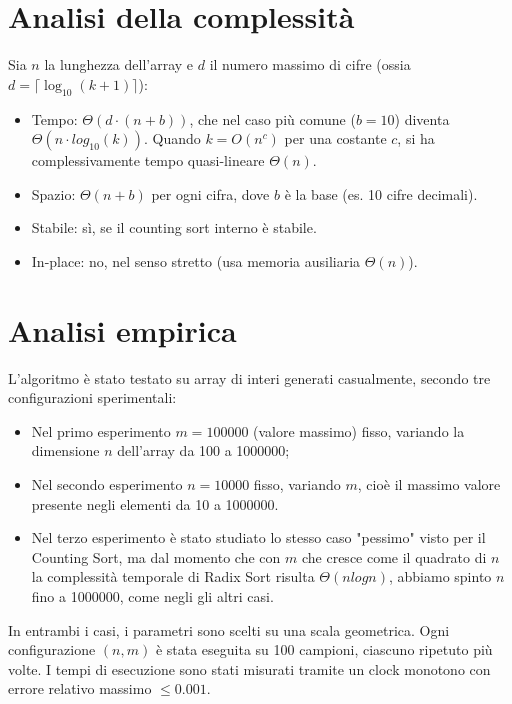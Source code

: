 \documentclass[a4paper, 12pt, oneside]{book}
\begin{document}
\section{Analisi della complessità}
Sia \(n\) la lunghezza dell'array e \(d\) il numero massimo di cifre (ossia \( d = \lceil \log_{10}(k + 1) \rceil \)): \\

\begin{itemize}
    \item Tempo: \(\Theta(d \cdot (n + b))\), che nel caso più comune (\(b = 10\)) diventa \(\Theta(n \cdot log_{10}(k))\). Quando \(k = O(n^c)\) per una costante \(c\), si ha complessivamente tempo quasi-lineare \(\Theta(n)\).
    \item Spazio: \(\Theta(n + b)\) per ogni cifra, dove \(b\) è la base (es. 10 cifre decimali).
    \item Stabile: sì, se il counting sort interno è stabile.
    \item In-place: no, nel senso stretto (usa memoria ausiliaria \(\Theta(n)\)).
\end{itemize}

\section{Analisi empirica}

L'algoritmo è stato testato su array di interi generati casualmente, secondo tre configurazioni sperimentali:

\begin{itemize}
    \item Nel primo esperimento \(m = 100000\) (valore massimo) fisso, variando la dimensione \(n\) dell'array da 100 a 1000000;
    \item Nel secondo esperimento \(n = 10000\) fisso, variando \(m\), cioè il massimo valore presente negli elementi da 10 a 1000000.
    \item Nel terzo esperimento è stato studiato lo stesso caso "pessimo" visto per il Counting Sort, ma dal momento che con \(m\) che cresce come il quadrato di \(n\) la complessità temporale di Radix Sort risulta \(\Theta(nlogn)\), abbiamo spinto \(n\) fino a 1000000, come negli gli altri casi.
\end{itemize}

\noindent In entrambi i casi, i parametri sono scelti su una scala geometrica. Ogni configurazione \((n, m)\) è stata eseguita su 100 campioni, ciascuno ripetuto più volte. I tempi di esecuzione sono stati misurati tramite un clock monotono con errore relativo massimo \(\leq 0.001\). \\
\end{document}
